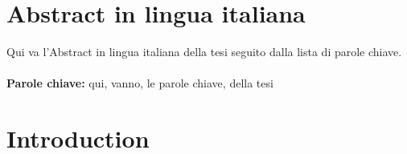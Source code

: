 \documentclass{config/PoliMi3i_thesis}
\begin{document}
\chapter*{Abstract in lingua italiana}
Qui va l'Abstract in lingua italiana della tesi seguito dalla lista di parole chiave.
\\
\\
\textbf{Parole chiave:} qui, vanno, le parole chiave, della tesi %


\thispagestyle{empty}
\tableofcontents %
\thispagestyle{empty}
\cleardoublepage

%
%
%    
%

\mainmatter %

\chapter*{Introduction}
\end{document}
